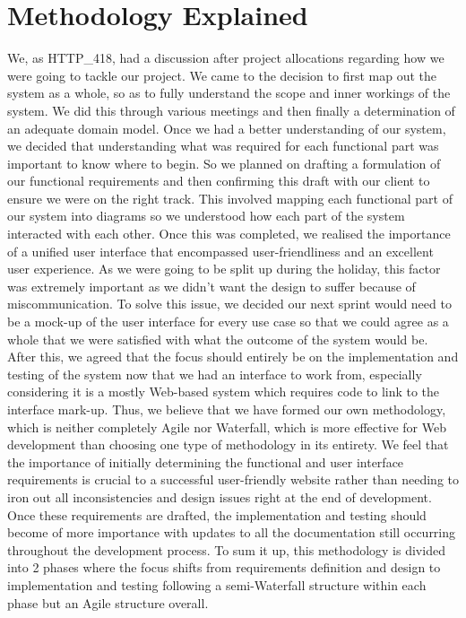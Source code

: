 \documentclass[11pt,fleqn]{book} %
\begin{document}

\chapter{Methodology Explained}
We, as HTTP\_418, had a discussion after project allocations regarding how we were going to tackle our project. We came to the decision to first map out the system as a whole, so as to fully understand the scope and inner workings of the system. We did this through various meetings and then finally a determination of an adequate domain model. Once we had a better understanding of our system, we decided that understanding what was required for each functional part was important to know where to begin. So we planned on drafting a formulation of our functional requirements and then confirming this draft with our client to ensure we were on the right track. This involved mapping each functional part of our system into diagrams so we understood how each part of the system interacted with each other.\newline\newline
Once this was completed, we realised the importance of a unified user interface that encompassed user-friendliness and an excellent user experience. As we were going to be split up during the holiday, this factor was extremely important as we didn’t want the design to suffer because of miscommunication. To solve this issue, we decided our next sprint would need to be a mock-up of the user interface for every use case so that we could agree as a whole that we were satisfied with what the outcome of the system would be. After this, we agreed that the focus should entirely be on the implementation and testing of the system now that we had an interface to work from, especially considering it is a mostly Web-based system which requires code to link to the interface mark-up. \newline\newline
Thus, we believe that we have formed our own methodology, which is neither completely Agile nor Waterfall, which is more effective for Web development than choosing one type of methodology in its entirety. We feel that the importance of initially determining the functional and user interface requirements is crucial to a successful user-friendly website rather than needing to iron out all inconsistencies and design issues right at the end of development. Once these requirements are drafted, the implementation and testing should become of more importance with updates to all the documentation still occurring throughout the development process. To sum it up, this methodology is divided into 2 phases where the focus shifts from requirements definition and design to implementation and testing following a semi-Waterfall structure within each phase but an Agile structure overall.
\end{document}
